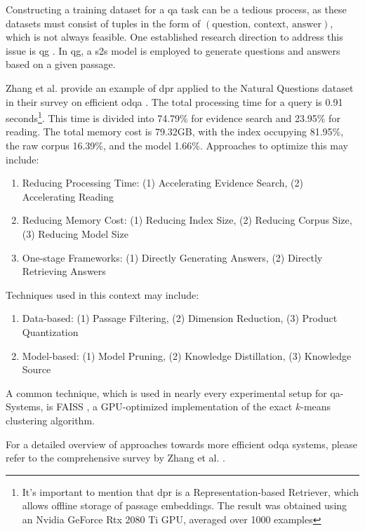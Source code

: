 Constructing a training dataset for a \gls{qa} task can be a tedious process, as these datasets must consist of tuples in the form of $(\text{question, context, answer})$, which is not always feasible. One established research direction to address this issue is \gls{qg} \cite{serban_generating_2016}. In \gls{qg}, a \gls{s2s} model is employed to generate questions and answers based on a given passage.

Zhang et al. provide an example of \gls{dpr} applied to the Natural Questions dataset in their survey on efficient \gls{odqa} \cite{zhang_survey_2023}. The total processing time for a query is 0.91 seconds\footnote{It's important to mention that \gls{dpr} is a Representation-based Retriever, which allows offline storage of passage embeddings. The result was obtained using an Nvidia GeForce Rtx 2080 Ti GPU, averaged over 1000 examples}. This time is divided into 74.79\% for evidence search and 23.95\% for reading. The total memory cost is 79.32GB, with the index occupying 81.95\%, the raw corpus 16.39\%, and the model 1.66\%. Approaches to optimize this may include:

\begin{enumerate}
    \item Reducing Processing Time: (1) Accelerating Evidence Search, (2) Accelerating Reading
    \item Reducing Memory Cost: (1) Reducing Index Size, (2) Reducing Corpus Size, (3) Reducing Model Size
    \item One-stage Frameworks: (1) Directly Generating Answers, (2) Directly Retrieving Answers
\end{enumerate}

Techniques used in this context may include:

\begin{enumerate}
    \item Data-based: (1) Passage Filtering, (2) Dimension Reduction, (3) Product Quantization
    \item Model-based: (1) Model Pruning, (2) Knowledge Distillation, (3) Knowledge Source 
\end{enumerate}

A common technique, which is used in nearly every experimental setup for \gls{qa}-Systems, is FAISS \cite{johnson_billion-scale_2017}, a GPU-optimized implementation of the exact $k$-means clustering algorithm.

For a detailed overview of approaches towards more efficient \gls{odqa} systems, please refer to the comprehensive survey by Zhang et al. \cite{zhang_survey_2023}.

